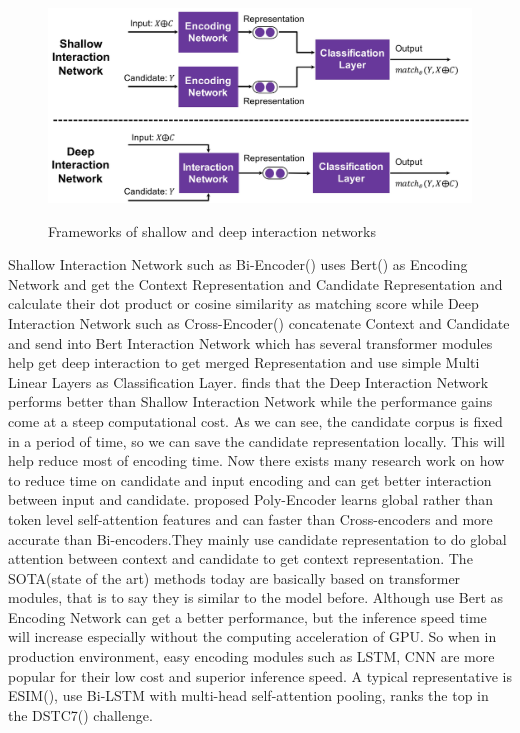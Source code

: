 \documentclass{article}
\begin{document}
\begin{figure}[htb]
\caption{Frameworks of shallow and deep interaction networks}
	\centering
	\includegraphics[width=1\linewidth]{images/Frameworks of shallow and deep interaction networks.png}
	\label{fig:fig1}
\end{figure}

Shallow Interaction Network such as Bi-Encoder(\cite{humeau2019poly}) uses Bert(\cite{devlin2018bert}) as Encoding Network and get the Context Representation and Candidate Representation and calculate their dot product or cosine similarity as matching score while Deep Interaction Network such as Cross-Encoder(\cite{humeau2019poly}) concatenate Context and Candidate and send into Bert Interaction Network which has several transformer modules help get deep interaction to get merged Representation and use simple Multi Linear Layers as Classification Layer. \cite{urbanek2019learning} finds that the Deep Interaction Network performs better than Shallow Interaction Network while the performance gains come at a steep computational cost. As we can see, the candidate corpus is fixed in a period of time, so we can save the candidate representation locally. This will help reduce most of encoding time. Now there exists many research work on how to reduce time on candidate and input encoding and can get better interaction between input and candidate. \cite{humeau2019poly} proposed Poly-Encoder learns global rather than token level self-attention features and can faster than Cross-encoders and more accurate than Bi-encoders.They mainly use candidate representation to do global attention between context and candidate to get context representation. The SOTA(state of the art) methods today are basically based on transformer modules, that is to say they is similar to the model before. Although use Bert as Encoding Network can get a better performance, but the inference speed time will increase especially without the computing acceleration of GPU. So when in production environment, easy encoding modules such as LSTM, CNN are more popular for their low cost and superior inference speed. A typical representative is ESIM(\cite{chen2019sequential}), use Bi-LSTM with multi-head self-attention pooling, ranks the top in the DSTC7(\cite{gunasekara2019dstc7}) challenge. 
\end{document}
